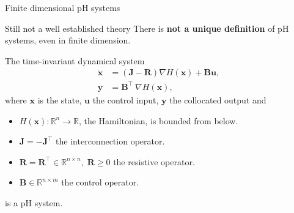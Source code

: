 \documentclass[aspectratio=169]{beamer}
\newcommand{\bbR}{\mathbb{R}}
\begin{document}
\begin{frame}{Finite dimensional pH systems}
	\begin{alertblock}{Still not a well established theory}
	There is \textbf{not a unique definition} of pH systems, even in finite dimension.
	\end{alertblock}
	\begin{definition}
		The time-invariant dynamical system
	\begin{equation*}
		\begin{aligned}
			\dot{\mathbf{x}} &= \left( \mathbf{J} - \mathbf{R} \right) \nabla H(\mathbf{x}) + \mathbf{B}\mathbf{u}, \\
			\mathbf{y} &= \mathbf{B}^\top ~ \nabla H(\mathbf{x}),
		\end{aligned}
	\end{equation*}
	where $\mathbf{x}$ is the state, $\mathbf{u}$ the control input, $\mathbf{y}$ the collocated output and
	\begin{itemize}
		\item $H(\mathbf{x}) : \mathbb{R}^n \rightarrow \mathbb{R}$, the Hamiltonian, is bounded from below.
		\item $\mathbf{J}=-\mathbf{J}^\top $ the interconnection operator.
		\item $\mathbf{R}=\mathbf{R}^\top \in \bbR^{n \times n}, \; \mathbf{R} \ge 0$ the resistive operator.
		\item $\mathbf{B} \in \bbR^{n \times m}$ the control operator.
	\end{itemize}
	is a pH system.
	\end{definition}
	
	


	
\end{frame}
\end{document}
